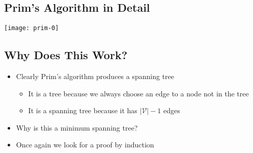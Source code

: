 
\begin{slide}
\section[-2]{Prim's Algorithm in Detail}
\pb
\pause
\begin{center}
  \texttt{[image: prim-0]}
  {}
\end{center}
\end{slide}



\begin{slide}
\section{Why Does This Work?}

\begin{PauseHighLight}
  \begin{itemize}
  \item Clearly Prim's algorithm produces a spanning tree\pause
    \begin{itemize}
    \item It is a tree because we always choose an edge to a node not in
      the tree\pause
    \item It is a spanning tree because it has $|\mathcal{V}|-1$ edges\pause
    \end{itemize}
  \item Why is this a minimum spanning tree?\pause
  \item Once again we look for a proof by induction\pause
  \end{itemize}
\end{PauseHighLight}

\end{slide}


